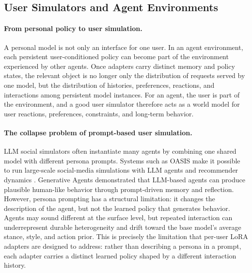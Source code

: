 \documentclass{llmxive}
\providecommand{\pony}[1]{#1}
\begin{document}
\subsection{\pony{User Simulators and Agent Environments}}\label{sec:personality-as-environment}

\paragraph{\pony{From personal policy to user simulation.}}
\pony{A personal model is not only an interface for one user. In an agent environment, each persistent user-conditioned policy can become part of the environment experienced by other agents. Once adapters carry distinct memory and policy states, the relevant object is no longer only the distribution of requests served by one model, but the distribution of histories, preferences, reactions, and interactions among persistent model instances. For an agent, the user is part of the environment, and a good user simulator therefore acts as a world model for user reactions, preferences, constraints, and long-term behavior.}

\paragraph{\pony{The collapse problem of prompt-based user simulation.}}
\pony{LLM social simulators often instantiate many agents by combining one shared model with different persona prompts. Systems such as OASIS make it possible to run large-scale social-media simulations with LLM agents and recommender dynamics \citep{oasis2024}. Generative Agents \citep{park2023generative} demonstrated that LLM-based agents can produce plausible human-like behavior through prompt-driven memory and reflection. However, persona prompting has a structural limitation: it changes the description of the agent, but not the learned policy that generates behavior. Agents may sound different at the surface level, but repeated interaction can underrepresent durable heterogeneity and drift toward the base model's average stance, style, and action prior. This is precisely the limitation that per-user LoRA adapters are designed to address: rather than describing a persona in a prompt, each adapter carries a distinct learned policy shaped by a different interaction history.}
\end{document}
